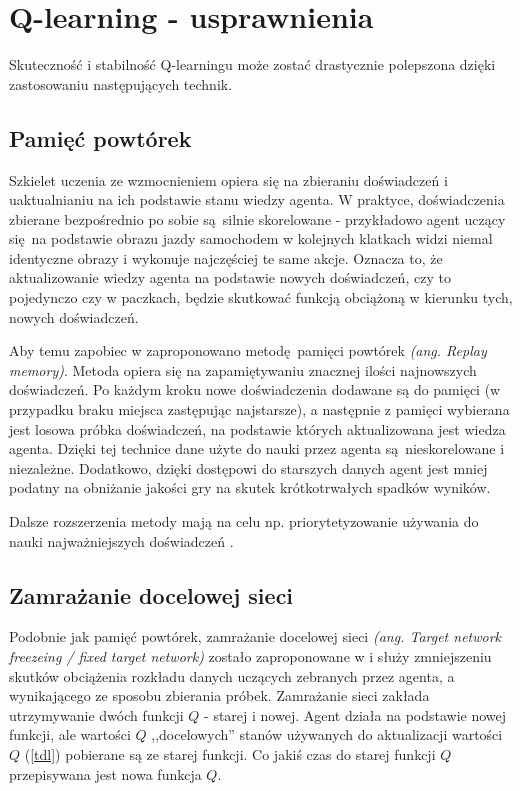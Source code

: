 \section{Q-learning - usprawnienia}\label{enhancements}
Skuteczność i stabilność Q-learningu może zostać drastycznie polepszona dzięki zastosowaniu następujących technik.

\subsection{Pamięć powtórek}\label{replaymemory}

Szkielet uczenia ze wzmocnieniem opiera się na zbieraniu doświadczeń i uaktualnianiu na ich podstawie stanu wiedzy agenta. W praktyce, doświadczenia zbierane bezpośrednio po sobie są silnie skorelowane - przykładowo agent uczący się na podstawie obrazu jazdy samochodem w kolejnych klatkach widzi niemal identyczne obrazy i wykonuje najczęściej te same akcje. Oznacza to, że aktualizowanie wiedzy agenta na podstawie nowych doświadczeń, czy to pojedynczo czy w paczkach, będzie skutkować funkcją obciążoną w kierunku tych, nowych doświadczeń.

Aby temu zapobiec w \cite{mnih2015human} zaproponowano metodę pamięci powtórek \textit{(ang. Replay memory)}. Metoda opiera się na zapamiętywaniu znacznej ilości najnowszych doświadczeń. Po każdym kroku nowe doświadczenia dodawane są do pamięci (w przypadku braku miejsca zastępując najstarsze), a następnie z pamięci wybierana jest losowa próbka doświadczeń, na podstawie których aktualizowana jest wiedza agenta. Dzięki tej technice dane użyte do nauki przez agenta są nieskorelowane i niezależne. Dodatkowo, dzięki dostępowi do starszych danych agent jest mniej podatny na obniżanie jakości gry na skutek krótkotrwałych spadków wyników.

Dalsze rozszerzenia metody mają na celu np. priorytetyzowanie używania do nauki najważniejszych doświadczeń \cite{DBLP:journals/corr/SchaulQAS15}.
\subsection{Zamrażanie docelowej sieci}\label{fixedtarget}

Podobnie jak pamięć powtórek, zamrażanie docelowej sieci \textit{(ang. Target network freezeing / fixed target network)} zostało zaproponowane w \cite{mnih2015human} i służy zmniejszeniu skutków obciążenia rozkładu danych uczących zebranych przez agenta, a wynikającego ze sposobu zbierania próbek. Zamrażanie sieci zakłada utrzymywanie dwóch funkcji $Q$ - starej i nowej. Agent działa na podstawie nowej funkcji, ale wartości $Q$ ,,docelowych'' stanów używanych do aktualizacji wartości $Q$ (\ref{tdl}) pobierane są ze starej funkcji. Co jakiś czas do starej funkcji $Q$ przepisywana jest nowa funkcja $Q$.

